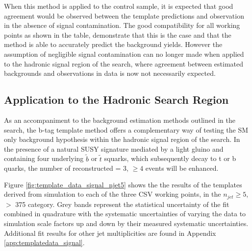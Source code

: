 When this method is applied to the \mupjets control sample, it is expected that good agreement would be observed between the template predictions and observation in the absence of signal contamination. The good compatibility for all working points as shown in the table, demonstrate that this is the case and that the method is able to accurately predict the background yields. However the assumption of negligible signal contamination can no longer made when applied to the hadronic signal region of the \alphat search, where agreement between estimated backgrounds and observations in data is now not necessarily expected.
 
\subsection{Application to the \alphat Hadronic Search Region}
\label{subsec:templatedataresults}

As an accompaniment to the background estimation methods outlined in the \alphat search, the b-tag template method offers a complementary way of testing the \ac{SM} only background hypothesis within the hadronic signal region of the search. In the presence of a natural \ac{SUSY} signature mediated by a light gluino and containing four underlying $\widetilde{b}$ or $\widetilde{t}$ squarks, which subsequently decay to t or b quarks, the number of reconstructed \nbreco = 3, $\geq 4$ events will be enhanced.

Figure \ref{fig:template_data_signal_njet5} shows the  the results of the templates derived from simulation to each of the three \ac{CSV} working points, in the $n_{jet} \geq 5$, \theht $>$ 375 \GeV category.  Grey bands represent the statistical uncertainty of the fit combined in quadrature with the systematic uncertainties of varying the data to simulation scale factors up and down by their measured systematic uncertainties.  Additional fit results for other jet multiplicities are found in Appendix \ref{app:templatedata_signal}.


